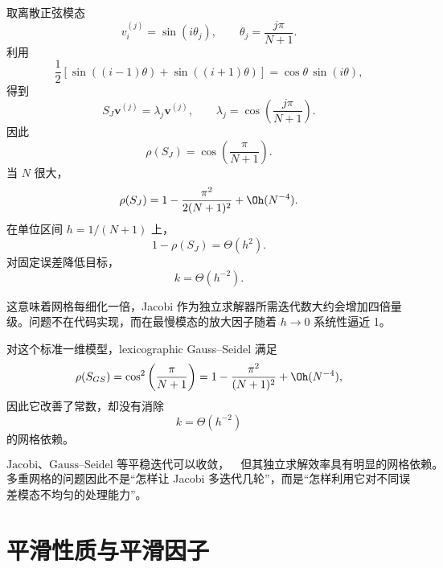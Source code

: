 取离散正弦模态
\begin{equation}
v_i^{(j)}
=
\sin(i\theta_j),
\qquad
\theta_j
=
\frac{j\pi}{N+1}.
\end{equation}
利用
\begin{equation}
\frac12
\left[
\sin((i-1)\theta)
+
\sin((i+1)\theta)
\right]
=
\cos\theta\,\sin(i\theta),
\end{equation}
得到
\begin{equation}
S_J\bm v^{(j)}
=
\lambda_j\bm v^{(j)},
\qquad
\lambda_j
=
\cos
\left(
\frac{j\pi}{N+1}
\right).
\label{eq:smoothing-jacobi-spectrum}
\end{equation}
因此
\begin{equation}
\rho(S_J)
=
\cos
\left(
\frac{\pi}{N+1}
\right).
\end{equation}
当 $N$ 很大，
\begin{equation}
\rho(S_J)
=
1-
\frac{\pi^2}{2(N+1)^2}
+
\Oh(N^{-4}).
\end{equation}
在单位区间 $h=1/(N+1)$ 上，
\begin{equation}
\boxed{
1-\rho(S_J)=\Theta(h^2).
}
\label{eq:smoothing-jacobi-gap}
\end{equation}
对固定误差降低目标，
\begin{equation}
\boxed{
k=\Theta(h^{-2}).
}
\label{eq:smoothing-jacobi-iterations}
\end{equation}

这意味着网格每细化一倍，Jacobi 作为独立求解器所需迭代数大约会增加四倍量级。问题不在代码实现，而在最慢模态的放大因子随着 $h\to0$ 系统性逼近 1。

对这个标准一维模型，lexicographic Gauss--Seidel 满足
\begin{equation}
\rho(S_{GS})
=
\cos^2
\left(
\frac{\pi}{N+1}
\right)
=
1-
\frac{\pi^2}{(N+1)^2}
+
\Oh(N^{-4}),
\end{equation}
因此它改善了常数，却没有消除
\begin{equation}
k=\Theta(h^{-2})
\end{equation}
的网格依赖。

\begin{keybox}
\[
\boxed{
\text{Jacobi、Gauss--Seidel 等平稳迭代可以收敛，}
\quad
\text{但其独立求解效率具有明显的网格依赖。}
}
\]
多重网格的问题因此不是“怎样让 Jacobi 多迭代几轮”，而是“怎样利用它对不同误差模态不均匀的处理能力”。
\end{keybox}

\section{平滑性质与平滑因子}
\label{sec:smoothing-property}

